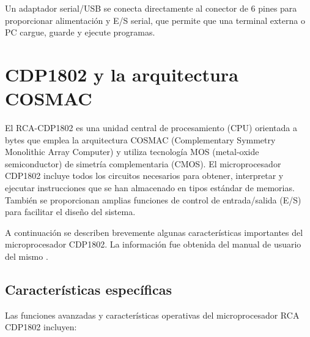 Un adaptador serial/USB se conecta directamente al conector de 6 pines para proporcionar alimentación y E/S serial, que permite que una terminal externa o PC cargue, guarde y ejecute programas.

\clearpage
\section{CDP1802 y la arquitectura COSMAC}

El RCA-CDP1802 es una unidad central de procesamiento (CPU) orientada a bytes que emplea la arquitectura COSMAC (Complementary Symmetry Monolithic Array Computer) y utiliza tecnología MOS (metal-oxide semiconductor) de simetría complementaria (CMOS). El microprocesador CDP1802 incluye todos los circuitos necesarios para obtener, interpretar y ejecutar instrucciones que se han almacenado en tipos estándar de memorias. También se proporcionan amplias funciones de control de entrada/salida (E/S) para facilitar el diseño del sistema.

A continuación se describen brevemente algunas características importantes del microprocesador CDP1802. La información fue obtenida del manual de usuario del mismo \cite{cdp1802_manual}.

\subsection{Características específicas}

Las funciones avanzadas y características operativas del microprocesador RCA CDP1802 incluyen:

